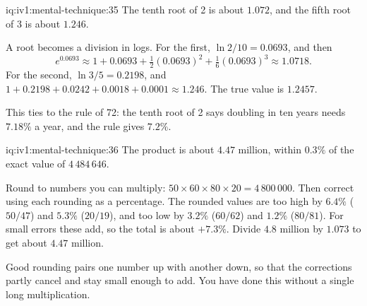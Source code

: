 \begin{solution}{iq:iv1:mental-technique:35}
The tenth root of 2 is about $1.072$, and the fifth root of 3 is about $1.246$.

A root becomes a division in logs. For the first, $\ln 2 / 10 = 0.0693$, and then
\[
e^{0.0693} \approx 1 + 0.0693 + \tfrac12 (0.0693)^2 + \tfrac16 (0.0693)^3 \approx 1.0718.
\]
For the second, $\ln 3 / 5 = 0.2198$, and $1 + 0.2198 + 0.0242 + 0.0018 + 0.0001 \approx 1.246$. The true value is $1.2457$.

This ties to the rule of 72: the tenth root of 2 says doubling in ten years needs $7.18\%$ a year, and the rule gives $7.2\%$.

\end{solution}

\begin{solution}{iq:iv1:mental-technique:36}
The product is about $4.47$ million, within $0.3\%$ of the exact value of $4\,484\,646$.

Round to numbers you can multiply: $50 \times 60 \times 80 \times 20 = 4\,800\,000$. Then correct using each rounding as a percentage. The rounded values are too high by $6.4\%$ ($50/47$) and $5.3\%$ ($20/19$), and too low by $3.2\%$ ($60/62$) and $1.2\%$ ($80/81$). For small errors these add, so the total is about $+7.3\%$. Divide $4.8$ million by $1.073$ to get about $4.47$ million.

Good rounding pairs one number up with another down, so that the corrections partly cancel and stay small enough to add. You have done this without a single long multiplication.

\end{solution}

